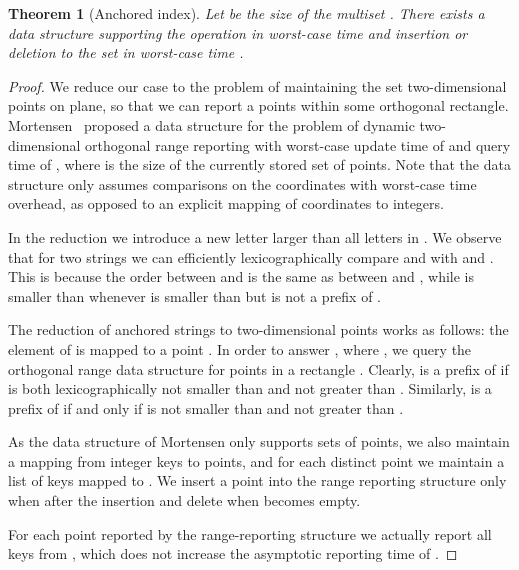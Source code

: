 \documentclass[a4paper]{article}
\newtheorem{theorem}{Theorem}[section]
\theoremstyle{remark}
\begin{document}
\begin{theorem}[Anchored index]\label{thm:ai}
  Let  be the size of the multiset .
  There exists a data structure supporting the  operation
in worst-case time  and insertion or deletion
to the set  in worst-case time .
\end{theorem}
\begin{proof}
We reduce our case to the problem of maintaining the set
two-dimensional points on plane, so that
we can report a points within some
orthogonal rectangle.
Mortensen~\cite{Mortensen:2003} proposed a data structure
for the problem of dynamic two-dimensional orthogonal
range reporting with worst-case update time of 
and query time of , where
 is the size of the currently stored set of points.
Note that the data structure only assumes comparisons on the coordinates
with worst-case  time overhead, as opposed to an explicit
mapping of coordinates to integers.

In the reduction we introduce a new letter  larger than all letters in .
We observe that for two strings  we can efficiently lexicographically compare  and  with  and .
This is because the order between  and  is the same as between  and ,
while  is smaller than  whenever  is smaller than  but is not a prefix of .

The reduction of anchored strings to two-dimensional
points works as follows: the element of 
is mapped to a point .
In order to answer , where , we
query the orthogonal range data structure for
 points in a rectangle
.
Clearly,  is a prefix of  if  is both
lexicographically not smaller than  and not greater than .
Similarly,  is a prefix of  if and only if
 is not smaller than  and not greater than .

As the data structure of Mortensen only supports sets of points,
we also maintain a mapping  from integer keys to
points, and for each distinct point  we maintain
a list of keys  mapped to .
We insert a point  into the range reporting structure only
when  after the insertion
and delete  when 
becomes empty.

For each point  reported by the range-reporting structure
we actually report all keys from , which does
not increase the asymptotic reporting time of .
\end{proof}
\end{document}
